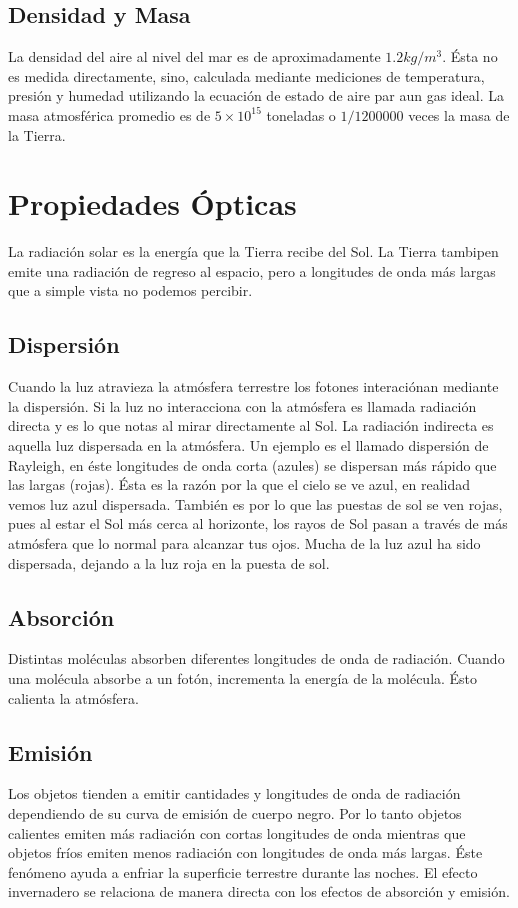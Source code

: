 \documentclass{article}
\begin{document}
\subsection{Densidad y Masa}
La densidad del aire al nivel del mar es de aproximadamente $1.2 kg/m^3$. Ésta no es medida directamente, sino, calculada mediante mediciones de temperatura, presión y humedad utilizando la ecuación de estado de aire par aun gas ideal. La masa atmosférica promedio es de $5\times10^{15}$ toneladas o $1/1200000$ veces la masa de la Tierra.
\section{Propiedades Ópticas}
La radiación solar es la energía que la Tierra recibe del Sol. La Tierra tambipen emite una radiación de regreso al espacio, pero a longitudes de onda más largas que a simple vista no podemos percibir.
\subsection{Dispersión}
Cuando la luz atravieza la atmósfera terrestre los fotones interaciónan mediante la dispersión. Si la luz no interacciona con la atmósfera es llamada radiación directa y es lo que notas al mirar directamente al Sol. La radiación indirecta es aquella luz dispersada en la atmósfera. Un ejemplo es el llamado dispersión de Rayleigh, en éste longitudes de onda corta (azules) se dispersan más rápido que las largas (rojas). Ésta es la razón por la que el cielo se ve azul, en realidad vemos luz azul dispersada. También es por lo que las puestas de sol se ven rojas, pues al estar el Sol más cerca al horizonte, los rayos de Sol pasan a través de más atmósfera que lo normal para alcanzar tus ojos. Mucha de la luz azul ha sido dispersada, dejando a la luz roja en la puesta de sol.
\subsection{Absorción}
Distintas moléculas absorben diferentes longitudes de onda de radiación. Cuando una molécula absorbe a un fotón, incrementa la energía de la molécula. Ésto calienta la atmósfera.
\subsection{Emisión}
Los objetos tienden a emitir cantidades y longitudes de onda de radiación dependiendo de su curva de emisión de cuerpo negro. Por lo tanto objetos calientes emiten más radiación con cortas longitudes de onda mientras que objetos fríos emiten menos radiación con longitudes de onda más largas. Éste fenómeno ayuda a enfriar la superficie terrestre durante las noches. El efecto invernadero se relaciona de manera directa con los efectos de absorción y emisión.
\end{document}
